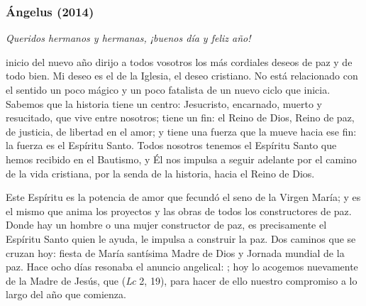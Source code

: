 \subsubsection{Ángelus (2014)} 


\begin{body}
	\emph{Queridos hermanos y hermanas, ¡buenos día y feliz año!}
	
	 inicio del nuevo año dirijo a todos vosotros los más cordiales deseos de paz y de todo bien. Mi deseo es el de la Iglesia, el deseo cristiano. No está relacionado con el sentido un poco mágico y un poco fatalista de un nuevo ciclo que inicia. Sabemos que la historia tiene un centro: Jesucristo, encarnado, muerto y resucitado, que vive entre nosotros; tiene un fin: el Reino de Dios, Reino de paz, de justicia, de libertad en el amor; y tiene una fuerza que la mueve hacia ese fin: la fuerza es el Espíritu Santo. Todos nosotros tenemos el Espíritu Santo que hemos recibido en el Bautismo, y Él nos impulsa a seguir adelante por el camino de la vida cristiana, por la senda de la historia, hacia el Reino de Dios.
	
	Este Espíritu es la potencia de amor que fecundó el seno de la Virgen María; y es el mismo que anima los proyectos y las obras de todos los constructores de paz. Donde hay un hombre o una mujer constructor de paz, es precisamente el Espíritu Santo quien le ayuda, le impulsa a construir la paz. Dos caminos que se cruzan hoy: fiesta de María santísima Madre de Dios y Jornada mundial de la paz. Hace ocho días resonaba el anuncio angelical: ; hoy lo acogemos nuevamente de la Madre de Jesús, que  (\emph{Lc} 2, 19), para hacer de ello nuestro compromiso a lo largo del año que comienza.
	

\end{body}
